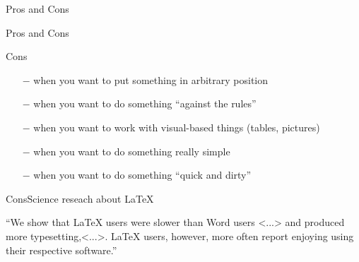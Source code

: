 
\begin{frame}{Pros and Cons}

\Huge\centering Pros and Cons
     
\end{frame}

\begin{frame}[fragile]{Cons}\relax
     \begin{itemize}
        \item[$-$] when you want to put something in {\csk arbitrary position} %
        \item[$-$] when you want to do something {\csk ``against the rules''} %
        \item[$-$] when you want to work with {\csk visual-based} things (tables, pictures) %
        \item[$-$] when you want to do something really {\csk simple} %
        \item[$-$] when you want to do something {\csk ``quick and dirty''} %
    \end{itemize}
    
    \cprotect{}
\end{frame}

\begin{frame}{Cons}{Science reseach about \LaTeX}\relax
     \begin{center}
     ``We show that LaTeX users were {\color{red}slower} than Word users <...> and produced {\color{red}more typesetting},<...>. LaTeX users, however, more often report {\color{green}enjoying using} their respective software.''  
     \end{center}

\end{frame}

